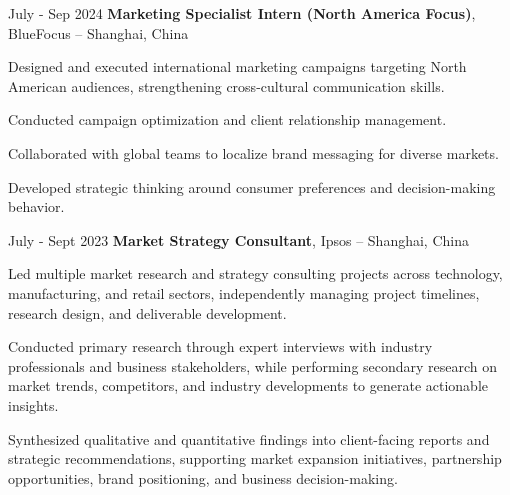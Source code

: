 \vspace{0.20 cm}
\begin{twocolentry}{
        July - Sep 2024
    }
    {\ResumeEntryTitleFont\textbf{Marketing Specialist Intern (North America Focus)}}, {\ResumeEntryMetaFont BlueFocus -- Shanghai, China}
\end{twocolentry}

\vspace{0.10 cm}
\begin{onecolentry}
    \begin{highlights}
        \item {\ResumeBulletFont Designed and executed international marketing campaigns targeting North American audiences, strengthening cross-cultural communication skills.}
        \item {\ResumeBulletFont Conducted campaign optimization and client relationship management.}
        \item {\ResumeBulletFont Collaborated with global teams to localize brand messaging for diverse markets.}
        \item {\ResumeBulletFont Developed strategic thinking around consumer preferences and decision-making behavior.}
    \end{highlights}
\end{onecolentry}

\vspace{0.20 cm}
\begin{twocolentry}{
        July - Sept 2023
    }
    {\ResumeEntryTitleFont\textbf{Market Strategy Consultant}}, {\ResumeEntryMetaFont Ipsos -- Shanghai, China}
\end{twocolentry}

\vspace{0.10 cm}
\begin{onecolentry}
    \begin{highlights}
        \item {\ResumeBulletFont Led multiple market research and strategy consulting projects across technology, manufacturing, and retail sectors, independently managing project timelines, research design, and deliverable development.}
        \item {\ResumeBulletFont Conducted primary research through expert interviews with industry professionals and business stakeholders, while performing secondary research on market trends, competitors, and industry developments to generate actionable insights.}
        \item {\ResumeBulletFont Synthesized qualitative and quantitative findings into client-facing reports and strategic recommendations, supporting market expansion initiatives, partnership opportunities, brand positioning, and business decision-making.}
    \end{highlights}
\end{onecolentry}


